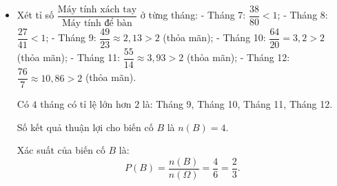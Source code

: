 \begin{bt}
{\begin{enumerate}[a)]
\begin{itemize}
				Số kết quả thuận lợi cho biến cố $A$ là $n(A) = 4$.
				
				Xác suất của biến cố $A$ là:
				$$P(A) = \dfrac{n(A)}{n(\Omega)} = \dfrac{4}{6} = \dfrac{2}{3}.$$
				\item Xét tỉ số $\dfrac{\text{Máy tính xách tay}}{\text{Máy tính để bàn}}$ ở từng tháng:
				- Tháng 7: $\dfrac{38}{80} < 1$;
				- Tháng 8: $\dfrac{27}{41} < 1$;
				- Tháng 9: $\dfrac{49}{23} \approx 2{,}13 > 2$ (thỏa mãn);
				- Tháng 10: $\dfrac{64}{20} = 3{,}2 > 2$ (thỏa mãn);
				- Tháng 11: $\dfrac{55}{14} \approx 3{,}93 > 2$ (thỏa mãn);
				- Tháng 12: $\dfrac{76}{7} \approx 10{,}86 > 2$ (thỏa mãn).
				
				Có $4$ tháng có tỉ lệ lớn hơn $2$ là: Tháng 9, Tháng 10, Tháng 11, Tháng 12.
				
				Số kết quả thuận lợi cho biến cố $B$ là $n(B) = 4$.
				
				Xác suất của biến cố $B$ là:
				$$P(B) = \dfrac{n(B)}{n(\Omega)} = \dfrac{4}{6} = \dfrac{2}{3}.$$
			\end{itemize}
		\end{enumerate}
	}
\end{bt}

